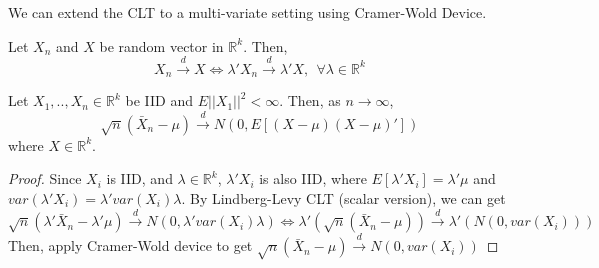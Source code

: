 We can extend the CLT to a multi-variate setting using Cramer-Wold Device.\par
\begin{mdframed}[backgroundcolor=green!5] 
\begin{theorem}
Let $X_n$ and $X$ be random vector in $\mathbb{R}^k$. Then, 
\[
X_n\xrightarrow{d}X\iff\lambda'X_n\xrightarrow{d}\lambda'X, \ \ \forall\lambda\in\mathbb{R}^k
\]
\end{theorem}

\begin{theorem}
Let $X_1,..,X_n\in\mathbb{R}^k$ be IID and $E|| X_1||^2<\infty$. Then, as $n\to\infty$, 
\[
\sqrt{n}(\bar{X}_n-\mu)\xrightarrow{d}N(0,E[(X-\mu)(X-\mu)'])
\]
where $X\in\mathbb{R}^k$.
\begin{proof}
Since $X_i$ is IID, and $\lambda\in\mathbb{R}^k$, $\lambda'X_i$ is also IID, where $E[\lambda'X_i]=\lambda'\mu$ and $var(\lambda'X_i)=\lambda'var(X_i)\lambda$. By Lindberg-Levy CLT (scalar version), we can get
\[
\sqrt{n}(\lambda'\bar{X}_n-\lambda'\mu)\xrightarrow{d}N(0,\lambda'var(X_i)\lambda) \iff \lambda'(\sqrt{n}(\bar{X}_n-\mu))\xrightarrow{d} \lambda'(N(0,var(X_i)))
\]
Then, apply Cramer-Wold device to get $\sqrt{n}(\bar{X}_n-\mu)\xrightarrow{d}N(0,var(X_i))$
\end{proof}
\end{theorem}
\end{mdframed}\par


